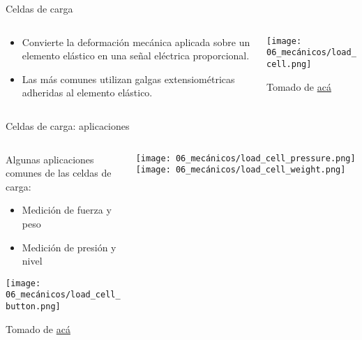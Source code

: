 \documentclass[aspectratio=169]{beamer}
\begin{document}
\begin{frame}{Celdas de carga}
    \begin{columns}[c, onlytextwidth]
        \begin{column}{0.60\textwidth}
            \begin{itemize}
                \item Convierte la deformación mecánica aplicada sobre un elemento elástico en una señal eléctrica proporcional.
                \item Las más comunes utilizan galgas extensiométricas adheridas al elemento elástico.
            \end{itemize}
        \end{column}
        \begin{column}{0.40\textwidth}
            \texttt{[image: 06\_mecánicos/load\_cell.png]}

            \tiny{Tomado de \href{https://www.flintec.com/}{acá}}
        \end{column}
    \end{columns}
\end{frame}


\begin{frame}{Celdas de carga: aplicaciones}
    \begin{columns}[c, onlytextwidth]
        \begin{column}{0.5\textwidth}
            Algunas aplicaciones comunes de las celdas de carga:
            \begin{itemize}
                \item Medición de fuerza y peso
                \item Medición de presión y nivel
            \end{itemize}
            \centering
            \texttt{[image: 06\_mecánicos/load\_cell\_button.png]}

            \tiny{Tomado de \href{https://www.flintec.com/}{acá}}
        \end{column}
        \begin{column}{0.5\textwidth}    
            \centering        
            \texttt{[image: 06\_mecánicos/load\_cell\_pressure.png]}
            \texttt{[image: 06\_mecánicos/load\_cell\_weight.png]}
        \end{column}
    \end{columns}
\end{frame}
\end{document}
